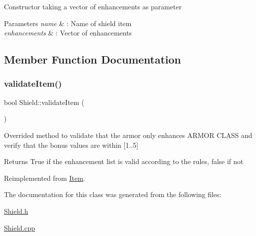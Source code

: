 Constructor taking a vector of enhancements as parameter 
\begin{DoxyParams}{Parameters}
{\em name} & \+: Name of shield item \\
\hline
{\em enhancements} & \+: Vector of enhancements \\
\hline
\end{DoxyParams}


\subsection{Member Function Documentation}
\hypertarget{class_shield_af28f146ed96720bd007a62a5871cd206}{}\label{class_shield_af28f146ed96720bd007a62a5871cd206} 
\subsubsection{\texorpdfstring{validate\+Item()}{validateItem()}}
{\footnotesize\ttfamily bool Shield\+::validate\+Item (\begin{DoxyParamCaption}{ }\end{DoxyParamCaption})\hspace{0.3cm}{\ttfamily [virtual]}}

Overrided method to validate that the armor only enhances \textquotesingle{}A\+R\+M\+OR C\+L\+A\+SS\textquotesingle{} and verify that the bonus values are within \mbox{[}1..5\mbox{]} \begin{DoxyReturn}{Returns}
True if the enhancement list is valid according to the rules, false if not 
\end{DoxyReturn}


Reimplemented from \hyperlink{class_item_a6603371b60aaded48f697975c81fc25b}{Item}.



The documentation for this class was generated from the following files\+:\begin{DoxyCompactItemize}
\item 
\hyperlink{_shield_8h}{Shield.\+h}\item 
\hyperlink{_shield_8cpp}{Shield.\+cpp}\end{DoxyCompactItemize}
